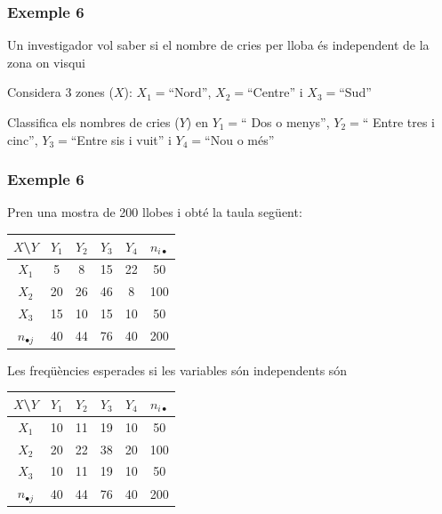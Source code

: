\documentclass[12pt,t]{beamer}
\theoremstyle{plain}
\theoremstyle{definition}
\begin{document}
\begin{frame}
\frametitle{Exemple 6}
Un investigador vol saber si el nombre de cries per lloba és independent de la zona on visqui
\medskip

Considera 3 zones ($X$): $X_1=$``Nord'', $X_2=$``Centre'' i  $X_3=$``Sud''
\medskip

Classifica els nombres de cries ($Y$) en
$Y_1=$`` Dos o menys'', $Y_2=$`` Entre tres i cinc'',  $Y_3=$``Entre sis i vuit'' i  $Y_4=$``Nou o
més''
\end{frame}






\begin{frame}
\frametitle{Exemple 6}

Pren una mostra de 200 llobes i obté la taula següent:
\begin{center}
\begin{tabular}{|c|cccc|c|}
\hline
$X$\textbackslash $Y$ & $Y_1$ & $Y_2$ & $Y_3$ & $Y_4$ & $n_{i\bullet}$\\ \hline
$X_1$ & 5   & 8   & 15  & 22   & 50 \\
$X_2$ & 20 &26  &46   & 8  & 100\\
$X_3$ & 15  & 10  & 15   & 10   & 50 \\
\hline
$n_{\bullet j}$ & 40 & 44 & 76 & 40 & 200 \\ \hline
\end{tabular}
\end{center}

Les freqüències esperades si les variables són independents són
\begin{center}
\begin{tabular}{|c|cccc|c|}
\hline
$X$\textbackslash $Y$ & $Y_1$ & $Y_2$ & $Y_3$ & $Y_4$ & $n_{i\bullet}$\\ \hline
$X_1$ &  10 &  11 &  19 &  10 & 50 \\
$X_2$ &  20 & 22 & 38 &  20 & 100\\
$X_3$ &  10 &  11 &  19 &  10 & 50 \\
\hline
$n_{\bullet j}$ & 40 & 44 & 76 & 40 & 200 \\ \hline
\end{tabular}
\end{center}

\end{frame}
\end{document}
